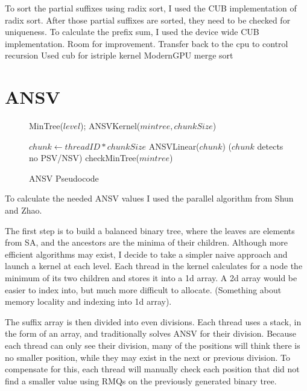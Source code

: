 To sort the partial suffixes using radix sort, I used the CUB implementation of radix sort.
After those partial suffixes are sorted, they need to be checked for uniqueness.
To calculate the prefix sum, I used the device wide CUB implementation.
Room for improvement.
Transfer back to the cpu to control recursion
Used cub for istriple kernel
ModernGPU merge sort

\section{ANSV}

\begin{figure}
\begin{algorithmic}[1]
\State MinTree($level$);
\EndFor
\State ANSVKernel($mintree,chunkSize$)
\EndProcedure
\end{algorithmic}
\begin{algorithmic}[1]
\State $chunk \gets threadID * chunkSize$
\State ANSVLinear($chunk$)
\If($chunk$ detects no PSV/NSV)
\State checkMinTree($mintree$)
\EndIf
\EndProcedure
\end{algorithmic}
\caption{ANSV Pseudocode}
\label{algorithm:ansv}
\end{figure}

To calculate the needed ANSV values I used the parallel algorithm from Shun and Zhao\cite{shun2013practical}.

The first step is to build a balanced binary tree, where the leaves are elements from SA, and the ancestors are the minima of their children.
Although more efficient algorithms may exist, I decide to take a simpler naive approach and launch a kernel at each level.
Each thread in the kernel calculates for a node the minimum of its two children and stores it into a 1d array.
A 2d array would be easier to index into, but much more difficult to allocate.
(Something about memory locality and indexing into 1d array).

The suffix array is then divided into even divisions.
Each thread uses a stack, in the form of an array, and traditionally solves ANSV for their division.
Because each thread can only see their division, many of the positions will think there is no smaller position, while they may exist in the next or previous division.
To compensate for this, each thread will manually check each position that did not find a smaller value using RMQs on the previously generated binary tree.

